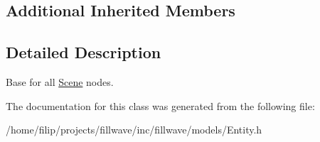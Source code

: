 \subsection*{Additional Inherited Members}


\subsection{Detailed Description}
Base for all \hyperlink{classflw_1_1flf_1_1Scene}{Scene} nodes. 

The documentation for this class was generated from the following file\+:\begin{DoxyCompactItemize}
\item 
/home/filip/projects/fillwave/inc/fillwave/models/Entity.\+h\end{DoxyCompactItemize}
